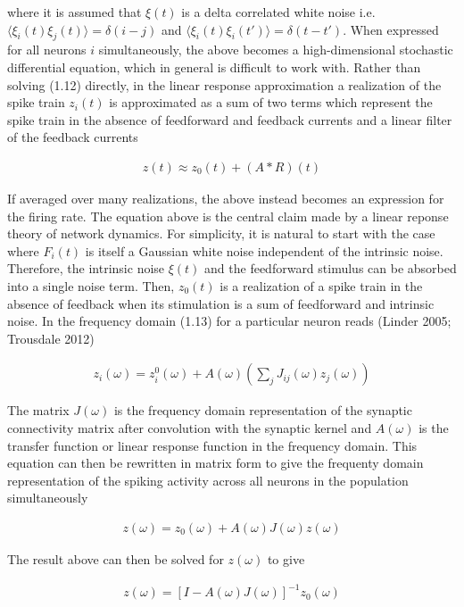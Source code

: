 \documentclass{ucetd}
\begin{document}
where it is assumed that $\xi(t)$ is a delta correlated white noise i.e. $\langle\xi_{i}(t)\xi_{j}(t)\rangle = \delta(i-j)$ and $\langle\xi_{i}(t)\xi_{i}(t')\rangle = \delta(t-t')$. When expressed for all neurons $i$ simultaneously, the above becomes a high-dimensional stochastic differential equation, which in general is difficult to work with. Rather than solving (1.12) directly, in the linear response approximation a realization of the spike train $z_{i}(t)$ is approximated as a sum of two terms which represent the spike train in the absence of feedforward and feedback currents and a linear filter of the feedback currents

\begin{align}
z(t) \approx z_{0}(t) + (A * R)(t) 
\end{align}

If averaged over many realizations, the above instead becomes an expression for the firing rate. The equation above is the central claim made by a linear reponse theory of network dynamics. For simplicity, it is natural to start with the case where $F_{i}(t)$ is itself a Gaussian white noise independent of the intrinsic noise. Therefore, the intrinsic noise $\xi(t)$ and the feedforward stimulus can be absorbed into a single noise term. Then, $z_{0}(t)$ is a realization of a spike train in the absence of feedback when its stimulation is a sum of feedforward and intrinsic noise. In the frequency domain (1.13) for a particular neuron reads (Linder 2005; Trousdale 2012)

\begin{align}
z_{i}(\omega) = z_{i}^{0}(\omega) + A(\omega)\left(\sum_{j}J_{ij}(\omega)z_{j}(\omega)\right)
\end{align}

The matrix $J(\omega)$ is the frequency domain representation of the synaptic connectivity matrix after convolution with the synaptic kernel and $A(\omega)$ is the transfer function or linear response function in the frequency domain. This equation can then be rewritten in matrix form to give the frequenty domain representation of the spiking activity across all neurons in the population simultaneously

\begin{align}
z(\omega) = z_{0}(\omega) + A(\omega)J(\omega)z(\omega)
\end{align}

The result above can then be solved for $z(\omega)$ to give 


\begin{align}
z(\omega) = \left[I-A(\omega)J(\omega)\right]^{-1}z_{0}(\omega)
\end{align}
\end{document}
